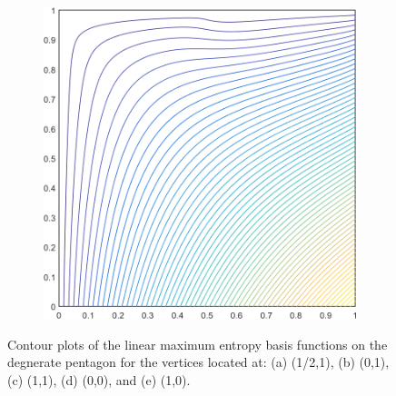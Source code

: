 \begin{figure}
\begin{subfigure}[b]{0.39\textwidth}
		\caption{}
	\end{subfigure}
	\hspace{1.5cm}
	\begin{subfigure}[b]{0.39\textwidth}
		\centering
		\includegraphics[width=\textwidth]{figures/sec_BF/deg_square_MAXENT1_contour_b2.png}
		\caption{}
	\end{subfigure}
\caption{Contour plots of the linear maximum entropy basis functions on the degnerate pentagon for the vertices located at: (a) (1/2,1), (b) (0,1), (c) (1,1), (d) (0,0), and (e) (1,0).}
\label{fig::2D_MAXENT1_deg_square_basis_functions}
\end{figure}

